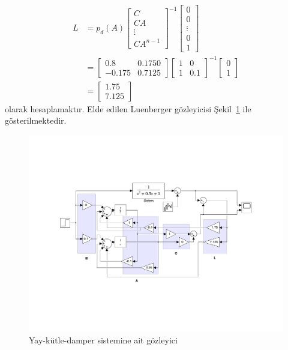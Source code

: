 \begin{equation}
\begin{split}
    L&=p_d(A)\begin{bmatrix}C\\ CA\\ \vdots\\ CA^{n-1}\end{bmatrix}^{-1}\begin{bmatrix}0\\ 0\\ \vdots\\ 0\\ 1\end{bmatrix}\\
    &=\begin{bmatrix} 0.8&0.1750\\-0.175&0.7125\end{bmatrix}
    \begin{bmatrix} 1&0\\1&0.1\end{bmatrix}^{-1}\begin{bmatrix}0\\ 1\end{bmatrix}\\
    &=\begin{bmatrix}1.75\\7.125\end{bmatrix}
\end{split}
\end{equation}
olarak hesaplamaktır. Elde edilen Luenberger gözleyicisi Şekil~\ref{fig:lec13_model1} ile gösterilmektedir.

\begin{figure}[!htb]
    \centering
    \includegraphics[width=\textwidth]{img/lec13_model1}
    \caption{Yay-kütle-damper sistemine ait gözleyici}
    \label{fig:lec13_model1}
\end{figure}

